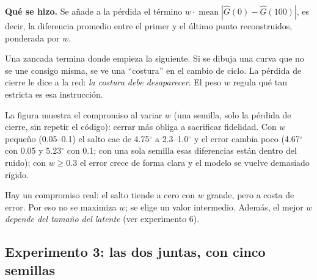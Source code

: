 \documentclass[11pt,a4paper]{article}
\newcommand{\gr}{$^\circ$}
\newcommand{\mae}{\textsc{mae}}
\begin{document}
\textbf{Qué se hizo.} Se añade a la pérdida el término $w\cdot\operatorname{mean}|\hat G(0)-\hat G(100)|$, es decir, la diferencia promedio entre el primer y el último punto reconstruidos, ponderada por $w$.

\begin{intuicion}
Una zancada termina donde empieza la siguiente. Si se dibuja una curva que no se une consigo misma, se ve una ``costura'' en el cambio de ciclo. La pérdida de cierre le dice a la red: \emph{la costura debe desaparecer}. El peso $w$ regula qué tan estricta es esa instrucción.
\end{intuicion}

La figura muestra el compromiso al variar $w$ (una semilla, solo la pérdida de cierre, sin repetir el código): cerrar más obliga a sacrificar fidelidad. Con $w$ pequeño (0.05--0.1) el salto cae de 4.75\gr{} a 2.3--1.0\gr{} y el error cambia poco (4.67\gr{} con 0.05 y 5.23\gr{} con 0.1; con una sola semilla esas diferencias están dentro del ruido); con $w\ge 0.3$ el error crece de forma clara y el modelo se vuelve demasiado rígido.

\begin{center}
\end{center}

\begin{cuidado}
Hay un compromiso real: el salto tiende a cero con $w$ grande, pero a costa de error. Por eso no se maximiza $w$; se elige un valor intermedio. Además, el mejor $w$ \emph{depende del tamaño del latente} (ver experimento 6).
\end{cuidado}

\subsection{Experimento 3: las dos juntas, con cinco semillas}
\end{document}
